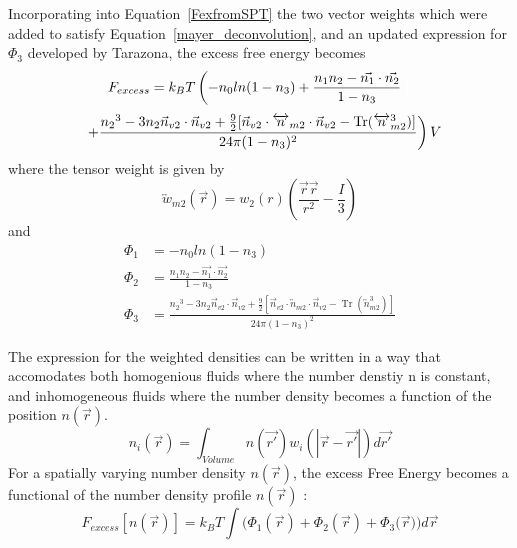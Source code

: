 \documentclass[double,12pt]{beavtex}
\begin{document}
Incorporating into Equation~\ref{FexfromSPT} the two vector weights which were added to satisfy Equation~\ref{mayer_deconvolution}, and an updated expression for $\Phi_3$ developed by Tarazona, the excess free energy becomes
\begin{displaymath}{F_{excess}=k_{B}T\left(-n_{0}ln(1-n_{3})+\frac{n_{1}n_{2}-\vec{n_{1}}\cdot\vec{n_{2}}}{1-n_{3}}\color{white}\right)}\end{displaymath}
\begin{equation}{\color{white}\left(\color{black}+\frac{{n_2}^3-3n_2\vec{n}_{v2}\cdot\vec{n}_{v2}+\frac{9}{2}[\vec{n}_{v2}\cdot{\overleftrightarrow{n}_{m2}}\cdot{\vec{n}_{v2}}-\operatorname{Tr}({\overleftrightarrow{n}^3_{m2}})]}{24\pi(1-n_3)^2}\right)\color{black}V}\end{equation} 
where the tensor weight is given by
\begin{equation}{\overleftrightarrow{w}_{m2}(\vec{r})=w_2(r)\left(\frac{\vec{r}\vec{r}}{r^2}-\frac{I}{3}\right)}\end{equation} 
and
\begin{align}
\Phi_1 &= -n_{0}ln(1-n_{3}) \\
\Phi_2 &= \frac{n_{1}n_{2}-\vec{n_{1}}\cdot\vec{n_{2}}}{1-n_{3}} \\
\Phi_3 &= \frac{{n_2}^3-3n_2\vec{n}_{v2}\cdot\vec{n}_{v2}+\frac{9}{2}[\vec{n}_{v2}\cdot{\overleftrightarrow{n}_{m2}}\cdot{\vec{n}_{v2}}-\operatorname{Tr}({\overleftrightarrow{n}^3_{m2}})]}{24\pi(1-n_3)^2}  
\end{align}

The expression for the weighted densities can be written in a way that accomodates both homogenious fluids where the number denstiy n is constant, and inhomogeneous fluids where the number density becomes a function of the position $n(\vec{r})$.
\begin{equation}{n_i(\vec{r})=\int_{Volume}{n(\vec{r'})w_i(|\vec{r}-\vec{r'}|)d{\vec{r'}}}}\end{equation}
For a spatially varying number density $n(\vec{r})$, the excess Free Energy becomes a functional of the number density profile $n(\vec{r})$ :
\begin{equation}{F_{excess}[n(\vec{r})]= k_BT\int(\Phi_1(\vec{r})+\Phi_2(\vec{r})+\Phi_3(\vec{r}{)) d}\vec{r}}\end{equation} 
\end{document}
